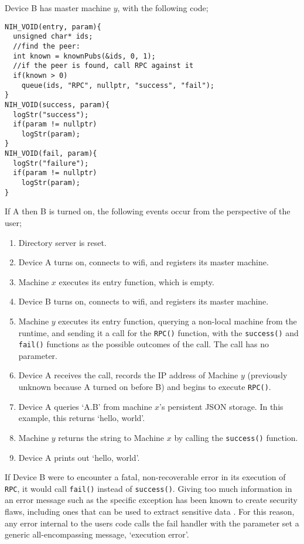 \documentclass{article}
\begin{document}
Device B has master machine \( y \), with the following code;
\begin{tcolorbox}[colback=white,grow to left by=2.5mm,grow to right by=2.5mm,left*=0mm,right*=0mm,sharp corners]
\begin{verbatim}
NIH_VOID(entry, param){
  unsigned char* ids;
  //find the peer:
  int known = knownPubs(&ids, 0, 1);
  //if the peer is found, call RPC against it
  if(known > 0)
    queue(ids, "RPC", nullptr, "success", "fail");
}
NIH_VOID(success, param){
  logStr("success");
  if(param != nullptr)
    logStr(param);
}
NIH_VOID(fail, param){
  logStr("failure");
  if(param != nullptr)
    logStr(param);
}
\end{verbatim}
\end{tcolorbox}

If A then B is turned on, the following events occur from the perspective of the user;

\begin{enumerate}
\item Directory server is reset.
\item Device A turns on, connects to wifi, and registers its master machine.
\item Machine \( x \) executes its entry function, which is empty.
\item Device B turns on, connects to wifi, and registers its master machine.
\item Machine \( y \) executes its entry function, querying a non-local machine from the runtime, and sending it a call for the \texttt{RPC()} function, with the \texttt{success()} and \texttt{fail()} functions as the possible outcomes of the call. The call has no parameter.
\item Device A receives the call, records the IP address of Machine \( y \) (previously unknown because A turned on before B) and begins to execute \texttt{RPC()}.
\item Device A queries \lq A.B' from machine \( x \)'s persistent JSON storage. In this example, this returns \lq hello, world'.
\item Machine \( y \) returns the string to Machine \( x \) by calling the \texttt{success()} function.
\item Device A prints out \lq hello, world'.
\end{enumerate}

If Device B were to encounter a fatal, non-recoverable error in its execution of \texttt{RPC}, it would call \texttt{fail()} instead of \texttt{success()}. Giving too much information in an error message such as the specific exception has been known to create security flaws, including ones that can be used to extract sensitive data \cite{weberror}. For this reason, any error internal to the users code calls the fail handler with the parameter set a generic all-encompassing message, \lq execution error'.
\end{document}
